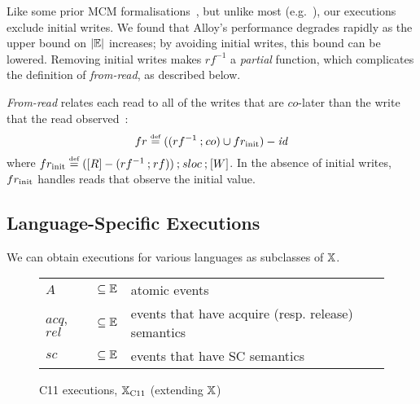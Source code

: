 \begin{remark} %
\label{rem:initial_writes} %
Like some prior MCM formalisations~\cite{sezgin04,mador-haim+12}, but
unlike most (e.g.~\cite{batty+11, alglave+13, alglave+10, lahav+16}),
our executions exclude initial writes. We found that Alloy's
performance degrades rapidly as the upper bound on $\lvert \mathbb{E} \rvert$
increases; by avoiding initial writes, this bound can be
lowered. Removing initial writes makes $rf^{-1}$ a \emph{partial}
function, which complicates the definition of \emph{from-read}, as
described below. %
\end{remark}
%
\begin{definition}
\label{def:fromread}
\emph{From-read} relates each read to all of the writes that are
$co$-later than the write that the read observed~\cite{ahamad+93}:
%
\[
fr \eqdef ((rf^{-1} \join co) \cup fr_{\rm init}) - \id
\]
%
where
$fr_{\rm init} \eqdef (\stor{R} - (rf^{-1} \join rf)) \join \sloc
\join \stor{W}$.
In the absence of initial writes, $fr_{\rm init}$ handles reads that observe the initial value.
%
\end{definition}
%
\subsection{Language-Specific Executions} 
\label{sec:language-specific-executions}

We can obtain executions for various languages as subclasses of
$\mathbb{X}$.

\begin{figure}[t]
\begin{tabular}{@{}l@{~}l@{~~~~}l}
$A$   & $\subseteq\mathbb{E}$ & atomic events \\
$acq$, $rel$ & $\subseteq\mathbb{E}$ & events that have acquire (resp. release) semantics \\
$sc$ & $\subseteq\mathbb{E}$ & events that have SC semantics
\end{tabular}
\par\vspace*{-2mm}
\caption{C11 executions, $\mathbb{X}_{\rm C11}$ (extending $\mathbb{X}$)}
\label{fig:c11_exec}
\end{figure}

